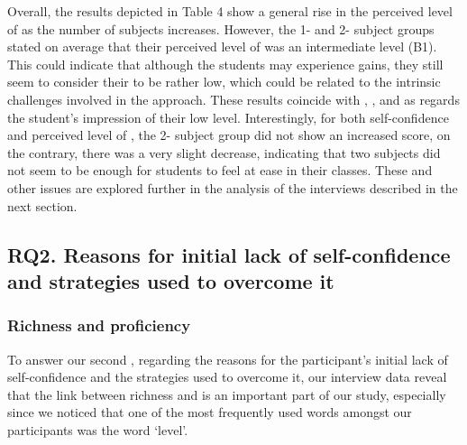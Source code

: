 \documentclass[output=paper]{langsci/langscibook}
\begin{document}
Overall, the results depicted in Table 4 show a general rise in the perceived level of  as the number of subjects increases. However, the 1- and 2- subject groups stated on average that their perceived level of  was an intermediate level (B1). This could indicate that although the students may experience  gains, they still seem to consider their  to be rather low, which could be related to the intrinsic challenges involved in the  approach. These results coincide with \citet{Arnó-MaciàMancho-Barés2015}, \citet{Muñoz2001}, and \citet{FeixasEtAl2009}  as  regards the student’s impression of their low  level. Interestingly, for both  self-confidence and perceived level of , the 2- subject group did not show an increased score, on the contrary, there was a very slight decrease, indicating that two  subjects did not seem to be enough for students to feel at ease in their classes. These and other issues are explored further in the analysis of the interviews described in the next section. 


\subsection{RQ2. Reasons for initial lack of self-confidence and strategies used to overcome it}
\subsubsection{Richness and proficiency} 

To answer our second , regarding the reasons for the participant’s initial lack of self-confidence and the strategies used to overcome it, our interview data reveal that the link between richness and  is an important part of our study, especially since we noticed that one of the most frequently used words amongst our participants was the word ‘level’. 
\end{document}
